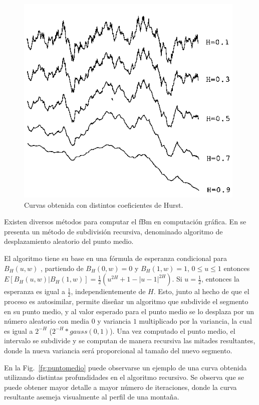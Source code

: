 \begin{figure}
\center
\includegraphics[width=11cm]{figures/hurst}
\caption{Curvas obtenida con distintos coeficientes de Hurst.}
\label{fg:hurst}
\end{figure}

Existen diversos métodos para computar el fBm en computación gráfica.
En \cite{Fournier1982} se presenta un método de subdivisión recursiva, denominado algoritmo de desplazamiento aleatorio del punto medio.

El algoritmo tiene su base en una fórmula de esperanza condicional para $B_{H}(u,w)$ \cite{Mandelbrot1968}, partiendo de $B_{H}(0,w) = 0$ y $B_{H}(1,w) = 1$, $0 \le u \le 1$ entonces $E[B_{H}(u,w)|B_{H}(1,w)] = \frac{1}{2} (u^{2H} + 1 - |u-1|^{2H})$.
Si $u=\frac{1}{2}$, entonces la esperanza es igual a $\frac{1}{2}$, independientemente de $H$.
Esto, junto al hecho de que el proceso es autosimilar, permite diseñar un algoritmo que subdivide el segmento en su punto medio, y al valor esperado para el punto medio se lo desplaza por un número aleatorio con media $0$ y variancia $1$ multiplicado por la variancia, la cual es igual a $2^{-H}$ ($2^{-H} * gauss(0,1) $).
Una vez computado el punto medio, el intervalo se subdivide y se computan de manera recursiva las mitades resultantes, donde la nueva variancia será proporcional al tamaño del nuevo segmento.

En la Fig.~\ref{fg:puntomedio} puede observarse un ejemplo de una curva obtenida utilizando distintas profundidades en el algoritmo recursivo.
Se observa que se puede obtener mayor detalle a mayor número de iteraciones, donde la curva resultante asemeja visualmente al perfil de una montaña.

